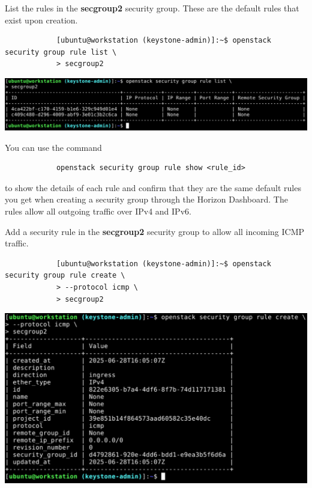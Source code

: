 \documentclass[letterpaper, 12pt]{article}
\begin{document}
\begin{enumerate}
    \begin{labstep}
        List the rules in the \textbf{secgroup2} security group.
        These are the default rules that exist upon creation.
        \begin{lstlisting}
            [ubuntu@workstation (keystone-admin)]:~$ openstack security group rule list \
            > secgroup2
        \end{lstlisting}

        \begin{center}
            \includegraphics[width=\linewidth]{images/part5/step16.png}
        \end{center}
    \end{labstep}

    \begin{tipbox}
        You can use the command
        \begin{lstlisting}
            openstack security group rule show <rule_id>
        \end{lstlisting}
        to show the details of each rule and confirm that they are the same default rules you get when creating a security group through the Horizon Dashboard.
        The rules allow all outgoing traffic over IPv4 and IPv6.
    \end{tipbox}

    \begin{labstep}
        Add a security rule in the \textbf{secgroup2} security group to allow all incoming ICMP traffic.
        \begin{lstlisting}
            [ubuntu@workstation (keystone-admin)]:~$ openstack security group rule create \
            > --protocol icmp \
            > secgroup2
        \end{lstlisting}

        \begin{center}
            \includegraphics[width=\linewidth]{images/part5/step17.png}
        \end{center}
    \end{labstep}


\end{enumerate}
\end{document}
